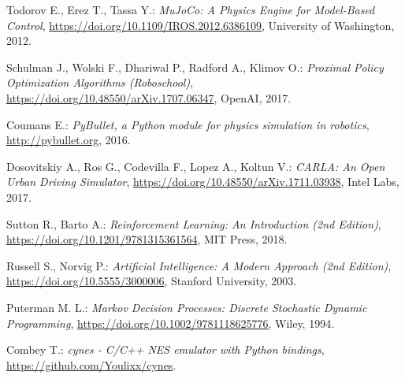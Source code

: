 \begin{thebibliography}{99}
	Todorov E., Erez T., Tassa Y.:
	\emph{MuJoCo: A Physics Engine for Model-Based Control},
	\url{https://doi.org/10.1109/IROS.2012.6386109},
	University of Washington, 2012.

	Schulman J., Wolski F., Dhariwal P., Radford A., Klimov O.:
	\emph{Proximal Policy Optimization Algorithms (Roboschool)},
	\url{https://doi.org/10.48550/arXiv.1707.06347},
	OpenAI, 2017.

	Coumans E.:
	\emph{PyBullet, a Python module for physics simulation in robotics},
	\url{http://pybullet.org},
	2016.

	Dosovitskiy A., Ros G., Codevilla F., Lopez A., Koltun V.:
	\emph{CARLA: An Open Urban Driving Simulator},
	\url{https://doi.org/10.48550/arXiv.1711.03938},
	Intel Labs, 2017.

	Sutton R., Barto A.:
	\emph{Reinforcement Learning: An Introduction (2nd Edition)},
	\url{https://doi.org/10.1201/9781315361564},
	MIT Press, 2018.

	Russell S., Norvig P.:
	\emph{Artificial Intelligence: A Modern Approach (2nd Edition)},
	\url{https://doi.org/10.5555/3000006},
	Stanford University, 2003.

	Puterman M. L.:
	\emph{Markov Decision Processes: Discrete Stochastic Dynamic Programming},
	\url{https://doi.org/10.1002/9781118625776},
	Wiley, 1994.

	Combey T.:
	\emph{cynes - C/C++ NES emulator with Python bindings},
	\url{https://github.com/Youlixx/cynes}.
\end{thebibliography}

